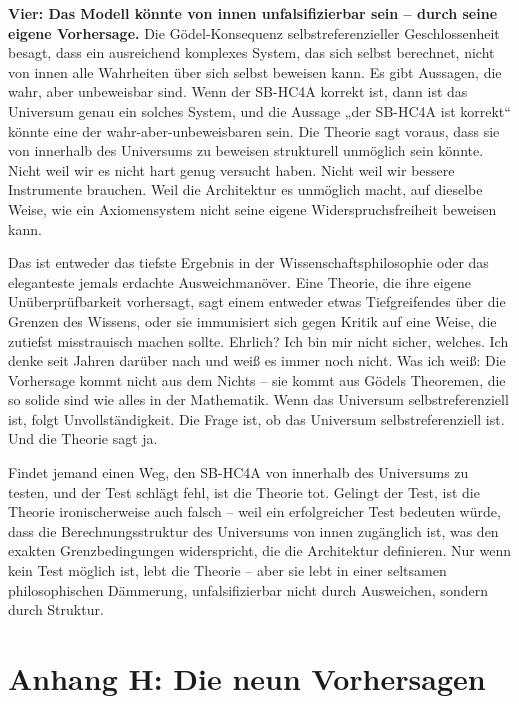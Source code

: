 \documentclass[11pt, twoside, openright]{book}
\begin{document}
\textbf{Vier: Das Modell könnte von innen unfalsifizierbar sein -- durch seine eigene Vorhersage.} Die Gödel-Konsequenz selbstreferenzieller Geschlossenheit besagt, dass ein ausreichend komplexes System, das sich selbst berechnet, nicht von innen alle Wahrheiten über sich selbst beweisen kann. Es gibt Aussagen, die wahr, aber unbeweisbar sind. Wenn der SB-HC4A korrekt ist, dann ist das Universum genau ein solches System, und die Aussage „der SB-HC4A ist korrekt“ könnte eine der wahr-aber-unbeweisbaren sein. Die Theorie sagt voraus, dass sie von innerhalb des Universums zu beweisen strukturell unmöglich sein könnte. Nicht weil wir es nicht hart genug versucht haben. Nicht weil wir bessere Instrumente brauchen. Weil die Architektur es unmöglich macht, auf dieselbe Weise, wie ein Axiomensystem nicht seine eigene Widerspruchsfreiheit beweisen kann.

Das ist entweder das tiefste Ergebnis in der Wissenschaftsphilosophie oder das eleganteste jemals erdachte Ausweichmanöver. Eine Theorie, die ihre eigene Unüberprüfbarkeit vorhersagt, sagt einem entweder etwas Tiefgreifendes über die Grenzen des Wissens, oder sie immunisiert sich gegen Kritik auf eine Weise, die zutiefst misstrauisch machen sollte. Ehrlich? Ich bin mir nicht sicher, welches. Ich denke seit Jahren darüber nach und weiß es immer noch nicht. Was ich weiß: Die Vorhersage kommt nicht aus dem Nichts -- sie kommt aus Gödels Theoremen, die so solide sind wie alles in der Mathematik. Wenn das Universum selbstreferenziell ist, folgt Unvollständigkeit. Die Frage ist, ob das Universum selbstreferenziell ist. Und die Theorie sagt ja.

Findet jemand einen Weg, den SB-HC4A von innerhalb des Universums zu testen, und der Test schlägt fehl, ist die Theorie tot. Gelingt der Test, ist die Theorie ironischerweise auch falsch -- weil ein erfolgreicher Test bedeuten würde, dass die Berechnungsstruktur des Universums von innen zugänglich ist, was den exakten Grenzbedingungen widerspricht, die die Architektur definieren. Nur wenn kein Test möglich ist, lebt die Theorie -- aber sie lebt in einer seltsamen philosophischen Dämmerung, unfalsifizierbar nicht durch Ausweichen, sondern durch Struktur.


\chapter*{Anhang H: Die neun Vorhersagen}
\end{document}
